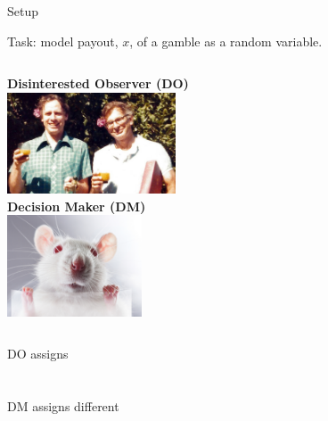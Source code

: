 \begin{frame}{Setup}
\begin{center}
Task: model payout, $x$, of a gamble as a random variable.
\end{center}
\begin{columns}[T]
	\centering
	\textbf{Disinterested Observer (DO)} \\
	\vspace{0.5em}
	\includegraphics[height=3cm]{img/TverskyKahnemanFunny} \\
	\vspace{0.5em}
	\centering
	\textbf{Decision Maker (DM)} \\
	\vspace{0.5em}
	\includegraphics[height=3cm]{img/LabRat} \\
	\vspace{0.5em}
\end{columns}

\begin{columns}[T]
	\vspace{0.5em}
	DO assigns\\
	 \\
  \\
	\vspace{0.5em}
  DM assigns different\\
  \\
   \\
\end{columns}
\end{frame}


